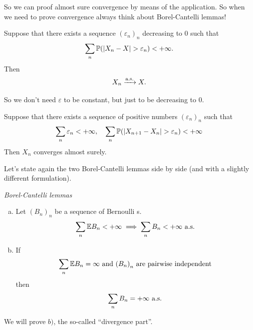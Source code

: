 \documentclass{report}
\begin{document}
So we can proof almost sure convergence by means of the application. So when we need to prove convergence always think about Borel-Cantelli lemmas!
\begin{proposition}
	Suppose that there exists a sequence ${(\varepsilon_n)}_{n}$ decreasing to 0 such that
	\[\sum_n\pr(|X_n-X|>\varepsilon_n)<+\infty.\]
	Then
	\[X_n\xrightarrow[]{\text{a.s.}} X.\]
\end{proposition}
So we don't need $\varepsilon$ to be constant, but just to be decreasing to 0.
\begin{proposition}
	Suppose that there exists a sequence of positive numbers ${(\varepsilon_n)}_{n}$ such that
	\[\sum_n\varepsilon_n<+\infty,\quad\sum_n\pr(|X_{n+1}-X_n|>\varepsilon_n)<+\infty\]
	Then $X_n$ converges almost surely.
\end{proposition}
Let's state again the two Borel-Cantelli lemmas side by side (and with a slightly different formulation).
\begin{theorem}
	\emph{Borel-Cantelli lemmas}\\
\begin{enumerate}[a)]
	\item Let ${(B_n)}_{n}$ be a sequence of Bernoulli \rv s.
	\[\sum_n \mathbb{E} B_n<+\infty\implies\sum_n B_n<+\infty\text{ a.s.}\]
	\item If 
	\[\sum_n\mathbb{E} B_n=\infty\text{ and }{(B_n)}_{n}\text{ are pairwise independent}\]
	then
	\[\sum_n B_n=+\infty\text{ a.s.}\]
\end{enumerate}
\end{theorem}
We will prove $b)$, the so-called ``divergence part''.
\end{document}
